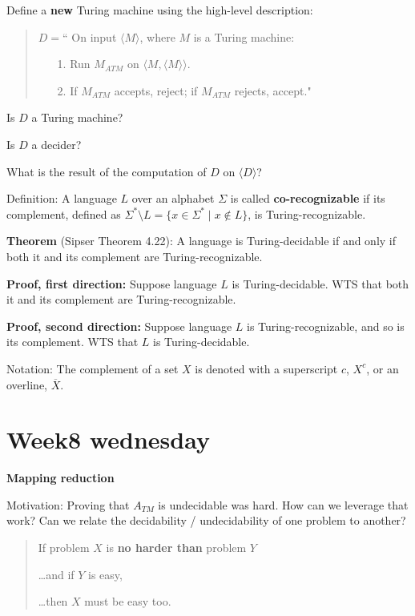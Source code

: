 \documentclass[12pt, oneside]{article}
\begin{document}
Define  a {\bf new} Turing machine using  the high-level description:
\begin{quote}
$D =  $`` On  input $\langle M \rangle$, where  $M$  is  a Turing machine:
\begin{itemize}
\item[1.] Run  $M_{ATM}$ on  $\langle M, \langle M \rangle  \rangle$.
\item[2.] If $M_{ATM}$ accepts, reject; if  $M_{ATM}$ rejects, accept."
\end{itemize}
\end{quote}


Is $D$ a  Turing machine?

\vspace{30pt}

Is  $D$ a  decider? 

\vspace{30pt}

What is the result of the computation  of $D$  on  $\langle D \rangle$?

\vfill


\newpage
Definition: A language $L$ over an  alphabet $\Sigma$ is called {\bf co-recognizable} if its complement,  defined
as $\Sigma^* \setminus L  = \{ x  \in  \Sigma^* \mid x \notin  L \}$, is Turing-recognizable.


\vfill 
{\bf  Theorem} (Sipser Theorem 4.22): A  language is Turing-decidable if and only if both  it and its complement
are Turing-recognizable.

{\bf Proof, first direction:}  Suppose  language  $L$ is  Turing-decidable.   WTS  that both it and its complement 
are Turing-recognizable.

\vfill

{\bf Proof, second direction:}  Suppose  language  $L$ is  Turing-recognizable, and  so is  its complement.   WTS  that $L$
is Turing-decidable.
\vfill


Notation: The complement  of a set $X$ is denoted with  a superscript $c$, $X^c$, or an overline,  $\overline{X}$. \vfill
\section*{Week8 wednesday}


{\bf Mapping reduction}

Motivation: Proving that $A_{TM}$ is undecidable was hard. How can we leverage that work? 
Can we relate the decidability / undecidability of one problem to another?

\begin{quote}
If problem $X$ is {\bf no harder than} problem $Y$

\ldots and if $Y$ is easy,

\ldots then $X$ must be easy too.
\end{quote}
\end{document}
